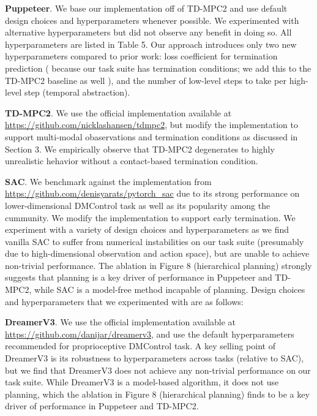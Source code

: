 \documentclass[sn-mathphys-num]{sn-jnl}%
\theoremstyle{thmstyleone}	%
\theoremstyle{thmstyletwo}	%
\theoremstyle{thmstylethree}	%
\begin{document}
\textbf{Puppeteer}.
We base our implementation off of TD-MPC2 and use default design choices and hyperparameters whenever possible.
We experimented with alternative hyperparameters but did not observe any benefit in doing so.
All hyperparameters are listed in Table 5.
Our approach introduces only two new hyperparameters compared to prior work:
loss coefficient for termination prediction
(
because our task suite has termination conditions; 
we add this to the TD-MPC2 baseline as well
),
and the number of low-level steps to take per high-level step (temporal abstraction).


\textbf{TD-MPC2}. 
We use the official implementation available at \href{https://github.com/nicklashansen/tdmpc2}{https://github.com/nicklashansen/tdmpc2}, but modify the implementation to support multi-modal obaservations and termination conditions as discussed in Section 3.
We empirically observe that TD-MPC2 degenerates to highly unrealistic hehavior without a contact-based termination condition.


\textbf{SAC}. 
We benchmark against the implementation from \href{https://github.com/denisyarats/pytorch_sac}{https://github.com/denisyarats/pytorch\_sac} due to its strong performance on lower-dimensional DMControl task as well as its popularity among the cummunity.
We modify the implementation to support early termination.
We experiment with a variety of design choices and hyperparameters as we find vanilla SAC to suffer from numerical instabilities on our task suite (presumably due to high-dimensional observation and action space), but are unable to achieve non-trivial performance.
The ablation in Figure 8 (hierarchical planning) strongly suggests that planning is a key driver of performance in Puppeteer and TD-MPC2, while SAC is a model-free method incapable of planning.
Design choices and hyperparameters that we experimented with are as follows:


\textbf{DreamerV3}. 
We use the official implementation available at \href{https://github.com/danijar/dreamerv3}{https://github.com/danijar/dreamerv3}, and use the default hyperparameters recommended for proprioceptive DMControl task.
A key selling point of DreamerV3 is its robustness to hyperparameters across tasks (relative to SAC), but we find that DreamerV3 does not achieve any non-trivial performance on our task suite.
While DreamerV3 is a model-based algorithm, it does not use planning, which the ablation in Figure 8 (hierarchical planning) finds to be a key driver of performance in Puppeteer and TD-MPC2.
\end{document}
